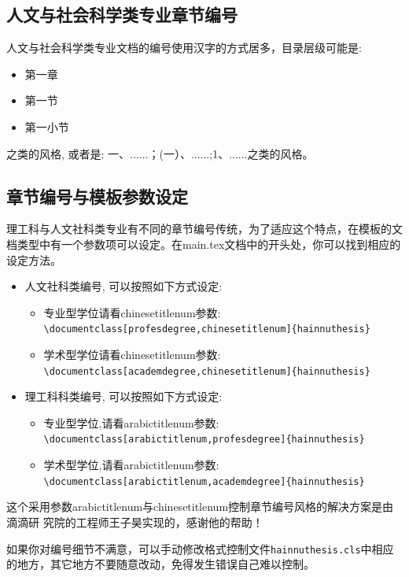 \subsection{人文与社会科学类专业章节编号}

人文与社会科学类专业文档的编号使用汉字的方式居多，目录层级可能是: 
\begin{itemize}
\item 第一章
\item \quad 第一节
\item \qquad 第一小节
\end{itemize}
之类的风格, 或者是: 一、......；(一）、......;1、......之类的风格。

\subsection{章节编号与模板参数设定}

理工科与人文社科类专业有不同的章节编号传统，为了适应这个特点，在模板的文档类型中有一个参数项可以设定。在main.tex文档中的开头处，你可以找到相应的设定方法。
\begin{itemize}
\item 人文社科类编号, 可以按照如下方式设定:
     \begin{itemize}
     \item 专业型学位请看chinesetitlenum参数: \\
     \lstinline|\documentclass[profesdegree,chinesetitlenum]{hainnuthesis}|
     \item 学术型学位请看chinesetitlenum参数: \\
     \lstinline|\documentclass[academdegree,chinesetitlenum]{hainnuthesis}|
     \end{itemize}
\item 理工科科类编号, 可以按照如下方式设定:
     \begin{itemize}
     \item 专业型学位,请看arabictitlenum参数: \\
     \lstinline|\documentclass[arabictitlenum,profesdegree]{hainnuthesis}|
     \item 学术型学位,请看arabictitlenum参数:\\
      \lstinline|\documentclass[arabictitlenum,academdegree]{hainnuthesis}|
     \end{itemize}
\end{itemize}
这个采用参数arabictitlenum与chinesetitlenum控制章节编号风格的解决方案是由滴滴研
究院的工程师王子昊实现的，感谢他的帮助！

如果你对编号细节不满意，可以手动修改格式控制文件\lstinline|hainnuthesis.cls|中相应的地方，其它地方不要随意改动，免得发生错误自己难以控制。

